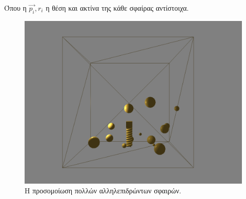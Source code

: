 \documentclass[11pt]{scrartcl} %
\begin{document}
Όπου η $\vec{p_i}, r_i$ η θέση και ακτίνα της κάθε σφαίρας αντίστοιχα.

\begin{figure}[H]
	\begin{center}
		\includegraphics[height=.5\textheight]{./assets/ballz.png}
	\end{center}
	\caption{Η προσομοίωση πολλών αλληλεπιδρώντων σφαιρών.}
\end{figure}
\end{document}
